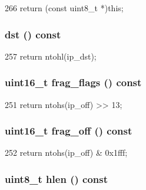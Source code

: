 \begin{DoxyCode}
266 { return (const uint8_t *)this; }
\end{DoxyCode}
\hypertarget{structNet_1_1IpHdr_abaa51876b847ffb08a197c2629fd726f}{
\subsubsection[{dst}]{ dst () const}}
\label{structNet_1_1IpHdr_abaa51876b847ffb08a197c2629fd726f}



\begin{DoxyCode}
257 { return ntohl(ip_dst); }
\end{DoxyCode}
\hypertarget{structNet_1_1IpHdr_a9560560c1794340e38ce0c57de395e26}{
\subsubsection[{frag\_\-flags}]{\setlength{\rightskip}{0pt plus 5cm}uint16\_\-t frag\_\-flags () const}}
\label{structNet_1_1IpHdr_a9560560c1794340e38ce0c57de395e26}



\begin{DoxyCode}
251 { return ntohs(ip_off) >> 13; }
\end{DoxyCode}
\hypertarget{structNet_1_1IpHdr_a0a3a20b42e18de08418ef99471e7e006}{
\subsubsection[{frag\_\-off}]{\setlength{\rightskip}{0pt plus 5cm}uint16\_\-t frag\_\-off () const}}
\label{structNet_1_1IpHdr_a0a3a20b42e18de08418ef99471e7e006}



\begin{DoxyCode}
252 { return ntohs(ip_off) & 0x1fff; }
\end{DoxyCode}
\hypertarget{structNet_1_1IpHdr_af9fa03e0db57f22a41099243b33a6825}{
\subsubsection[{hlen}]{\setlength{\rightskip}{0pt plus 5cm}uint8\_\-t hlen () const}}
\label{structNet_1_1IpHdr_af9fa03e0db57f22a41099243b33a6825}



